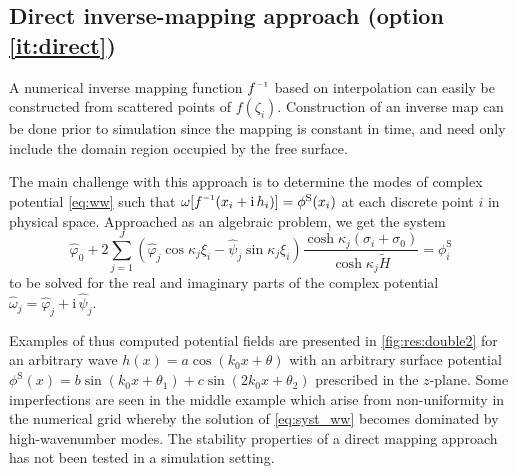 \documentclass[internal]{sintefmemo}
\newcommand{\mr}{\mathrm}
\renewcommand{\S}{^\mr{S}}
\newcommand{\ii}{\mr{i}\,}
\renewcommand{\_}[1]{_\mr{#1}}
\let\Re\relax
\let\Im\relax
\DeclareMathOperator\Re{Re}
\DeclareMathOperator\Im{Im}
\newcommand{\h}{\hat}
\newcommand{\z}{z}
\newcommand{\x}{x}
\newcommand{\zz}{\zeta}
\newcommand{\xx}{\xi}
\newcommand{\yy}{\sigma}
\newcommand{\kk}{\kappa}
\newcommand{\zmap}{f}
\newcommand{\zzmap}{\zmap^{\raisebox{.2ex}{$\scriptscriptstyle-1$}}}
\newcommand{\ww}{\omega}
\begin{document}
\subsection{Direct inverse-mapping approach (option \ref{it:direct})}
A numerical inverse mapping function $\zzmap$ based on interpolation can easily be constructed from scattered points of $\zmap(\zz_i)$. 
Construction of an inverse map can be done prior to simulation since the mapping is constant in time, and need only include the domain region occupied by the free surface. %

The main challenge with this approach is to determine the modes of complex potential \eqref{eq:ww} such that $\Re\ww[\zzmap(\x_i+\ii h_i)]=\phi\S(\x_i)$ at each discrete point $i$ in physical space.
Approached as an algebraic problem, we get the system
\begin{equation}
\h\varphi_0 + 2\sum_{j=1}^J (\h\varphi_j \cos\kk_j \xx_i - \h\psi_j \sin\kk_j \xx_i )\frac{\cosh \kk_j(\yy_i+\yy_0)}{\cosh\kk_j\tilde H} = \phi\S_i
\label{eq:syst_ww}
\end{equation}
to be solved for the real and imaginary parts of the complex potential
$\h\ww_j = \h\varphi_j + \ii \h\psi_j$. 

Examples of thus computed potential fields are presented in \autoref{fig:res:double2} for an arbitrary wave $h(\x) = a\cos(k_0 \x + \theta)$ with an arbitrary surface potential $\phi\S(\x) = b\sin(k_0 \x + \theta_1) + c\sin(2k_0 \x + \theta_2)$ prescribed in the $\z$-plane. Some imperfections are seen in the middle example which arise from non-uniformity in the numerical grid whereby the solution of \eqref{eq:syst_ww} becomes dominated by high-wavenumber modes.
The stability properties of a direct mapping approach has not been tested in a simulation setting.
\end{document}

